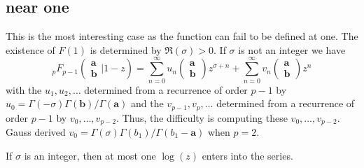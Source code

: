 \documentclass[12pt]{article}
\numberwithin{equation}{section}
\newcommand{\FF}[6] {{}_{#1}{#2}_{#3} \left( \begin{array}{c} #4 \\ #5 \end{array} \Big| {#6}  \right)}
\newcommand{\bfa}[0] {\mathbf{a}}
\begin{document}
\subsection{near one}
This is the most interesting case as the function can fail to be defined at one. The existence of $F(1)$ is determined by $\Re(\sigma)> 0$. If $\sigma$ is not an integer we have
\begin{equation}
\label{nearone}
\FF{p}{F}{p-1}{\mathbf{a}}{\mathbf{b}}{1-z} = \sum_{n=0}^{\infty} u_n \left(\begin{array}{c} \mathbf{a}\\\mathbf{b}\end{array} \right) z^{\sigma+n} + \sum_{n=0}^{\infty} v_n \left(\begin{array}{c} \mathbf{a}\\\mathbf{b}\end{array} \right) z^n
\end{equation}
with the $u_1,u_2,\dots$ determined from a recurrence of order $p-1$ by $u_0 = \Gamma(-\sigma)\Gamma(\mathbf{b})/\Gamma(\mathbf{a})$ and the $v_{p-1}, v_p, \dots$ determined from a recurrence of order $p-1$ by $v_0, \dots, v_{p-2}$. Thus, the difficulty is computing these $v_0, \dots, v_{p-2}$. Gauss derived $v_0 = \Gamma(\sigma)\Gamma(b_1)/\Gamma(b_1-\bfa)$ when $p=2$.

If $\sigma$ is an integer, then at most one $\log(z)$ enters into the series.
\end{document}
